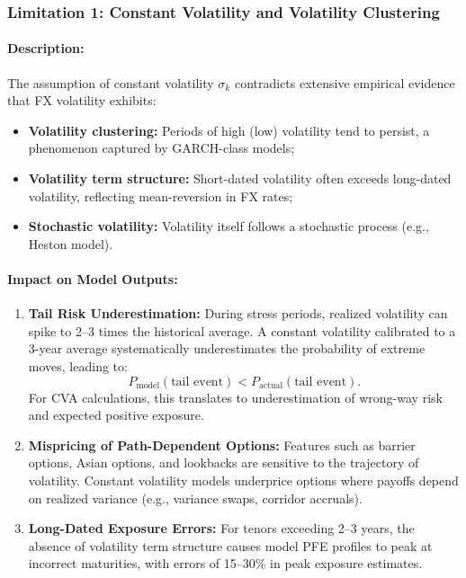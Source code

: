 \subsubsection{Limitation 1: Constant Volatility and Volatility Clustering}

\paragraph{Description:}
The assumption of constant volatility $\sigma_k$ contradicts extensive empirical evidence that FX volatility exhibits:
\begin{itemize}
	\item \textbf{Volatility clustering:} Periods of high (low) volatility tend to persist, a phenomenon captured by GARCH-class models;
	\item \textbf{Volatility term structure:} Short-dated volatility often exceeds long-dated volatility, reflecting mean-reversion in FX rates;
	\item \textbf{Stochastic volatility:} Volatility itself follows a stochastic process (e.g., Heston model).
\end{itemize}

\paragraph{Impact on Model Outputs:}
\begin{enumerate}
	\item \textbf{Tail Risk Underestimation:} During stress periods, realized volatility can spike to 2--3 times the historical average. A constant volatility calibrated to a 3-year average systematically underestimates the probability of extreme moves, leading to:
	\begin{equation}
		P_{\text{model}}(\text{tail event}) < P_{\text{actual}}(\text{tail event}).
	\end{equation}
	For CVA calculations, this translates to underestimation of wrong-way risk and expected positive exposure.
	
	\item \textbf{Mispricing of Path-Dependent Options:} Features such as barrier options, Asian options, and lookbacks are sensitive to the trajectory of volatility. Constant volatility models underprice options where payoffs depend on realized variance (e.g., variance swaps, corridor accruals).
	
	\item \textbf{Long-Dated Exposure Errors:} For tenors exceeding 2--3 years, the absence of volatility term structure causes model PFE profiles to peak at incorrect maturities, with errors of 15--30\% in peak exposure estimates.
\end{enumerate}

